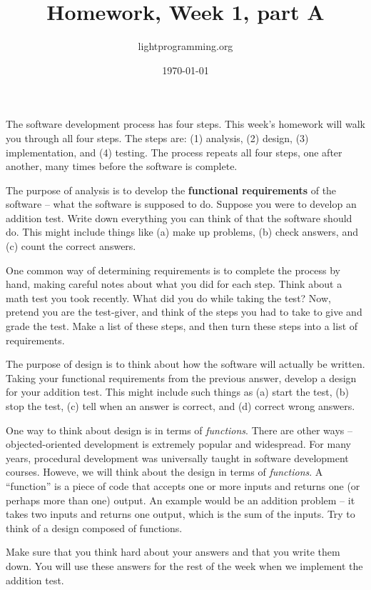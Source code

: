 \documentclass{article}
\title{Homework, Week 1, part A}
\author{lightprogramming.org}
\date{\today}
\begin{document}
\maketitle{}

The software development process has four steps. This week's homework will walk you through all four steps. The steps are: (1) analysis, (2) design, (3) implementation, and (4) testing. The process repeats all four steps, one after another, many times before the software is complete.

The purpose of analysis is to develop the \textbf{functional requirements} of the software -- what the software is supposed to do. Suppose you were to develop an addition test. Write down everything you can think of that the software should do. This might include things like (a) make up problems, (b) check answers, and (c) count the correct answers.

One common way of determining requirements is to complete the process by hand, making careful notes about what you did for each step. Think about a math test you took recently. What did you do while taking the test? Now, pretend you are the test-giver, and think of the steps you had to take to give and grade the test. Make a list of these steps, and then turn these steps into a list of requirements. 

The purpose of design is to think about how the software will actually be written. Taking your functional requirements from the previous answer, develop a design for your addition test. This might include such things as (a) start the test, (b) stop the test, (c) tell when an answer is correct, and (d) correct wrong answers.

One way to think about design is in terms of \textit{functions}. There are other ways -- objected-oriented development is extremely popular and widespread. For many years, procedural development was universally taught in software development courses. Howeve, we will think about the design in terms of \textit{functions}. A ``function'' is a piece of code that accepts one or more inputs and returns one (or perhaps more than one) output. An example would be an addition problem -- it takes two inputs and returns one output, which is the sum of the inputs. Try to think of a design composed of functions.

Make sure that you think hard about your answers and that you write them down. You will use these answers for the rest of the week when we implement the addition test.

%
%
%
%
%
\end{document}
